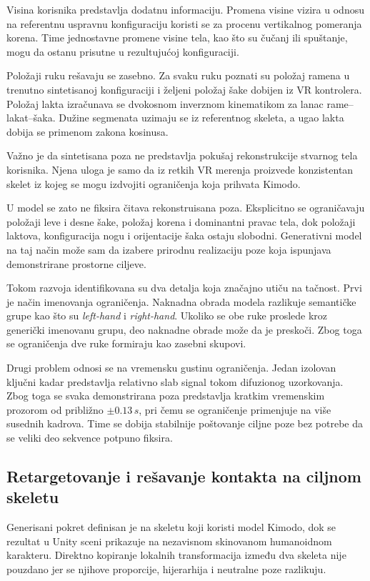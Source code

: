 \documentclass{article}
\begin{document}
Visina korisnika predstavlja dodatnu informaciju. Promena visine vizira u odnosu na referentnu uspravnu konfiguraciju koristi se za procenu vertikalnog pomeranja korena. Time jednostavne promene visine tela, kao što su čučanj ili spuštanje, mogu da ostanu prisutne u rezultujućoj konfiguraciji.

Položaji ruku rešavaju se zasebno. Za svaku ruku poznati su položaj ramena u trenutno sintetisanoj konfiguraciji i željeni položaj šake dobijen iz VR kontrolera. Položaj lakta izračunava se dvokosnom inverznom kinematikom za lanac rame--lakat--šaka. Dužine segmenata uzimaju se iz referentnog skeleta, a ugao lakta dobija se primenom zakona kosinusa.

Važno je da sintetisana poza ne predstavlja pokušaj rekonstrukcije stvarnog tela korisnika. Njena uloga je samo da iz retkih VR merenja proizvede konzistentan skelet iz kojeg se mogu izdvojiti ograničenja koja prihvata Kimodo.

U model se zato ne fiksira čitava rekonstruisana poza. Eksplicitno se ograničavaju položaji leve i desne šake, položaj korena i dominantni pravac tela, dok položaji laktova, konfiguracija nogu i orijentacije šaka ostaju slobodni. Generativni model na taj način može sam da izabere prirodnu realizaciju poze koja ispunjava demonstrirane prostorne ciljeve.

Tokom razvoja identifikovana su dva detalja koja značajno utiču na tačnost. Prvi je način imenovanja ograničenja. Naknadna obrada modela razlikuje semantičke grupe kao što su \textit{left-hand} i \textit{right-hand}. Ukoliko se obe ruke proslede kroz generički imenovanu grupu, deo naknadne obrade može da je preskoči. Zbog toga se ograničenja dve ruke formiraju kao zasebni skupovi.

Drugi problem odnosi se na vremensku gustinu ograničenja. Jedan izolovan ključni kadar predstavlja relativno slab signal tokom difuzionog uzorkovanja. Zbog toga se svaka demonstrirana poza predstavlja kratkim vremenskim prozorom od približno $\pm0.13\,s$, pri čemu se ograničenje primenjuje na više susednih kadrova. Time se dobija stabilnije poštovanje ciljne poze bez potrebe da se veliki deo sekvence potpuno fiksira.

\subsection{Retargetovanje i rešavanje kontakta na ciljnom skeletu}
\label{sec:retarget}

Generisani pokret definisan je na skeletu koji koristi model Kimodo, dok se rezultat u Unity sceni prikazuje na nezavisnom skinovanom humanoidnom karakteru. Direktno kopiranje lokalnih transformacija između dva skeleta nije pouzdano jer se njihove proporcije, hijerarhija i neutralne poze razlikuju.
\end{document}
